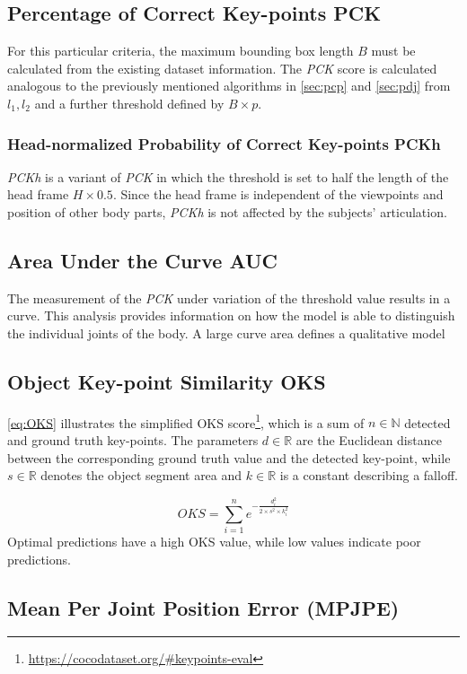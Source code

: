 \subsection{Percentage of Correct Key-points PCK}
For this particular criteria, the maximum bounding box length $B$ must be calculated from the existing dataset information. The \emph{PCK} score is calculated analogous to the previously mentioned algorithms in \autoref{sec:pcp} and \autoref{sec:pdj} from $l_{1}, l_{2}$ and a further threshold defined by $B \times p$. \cite{mpii, pck}

\subsubsection{Head-normalized Probability of Correct Key-points PCKh}
\emph{PCKh} is a variant of \emph{PCK} in which the threshold is set to half the length of the head frame $H \times 0.5$. Since the head frame is independent of the viewpoints and position of other body parts, \emph{PCKh} is not affected by the subjects' articulation. \cite{mpii}

\subsection{Area Under the Curve AUC}
The measurement of the \emph{PCK} under variation of the threshold value results in a curve. This analysis provides information on how the model is able to distinguish the individual joints of the body. A large curve area defines a qualitative model %

\subsection{Object Key-point Similarity OKS}
\autoref{eq:OKS} illustrates the simplified OKS score\footnote{\url{https://cocodataset.org/\#keypoints-eval}}, which is a sum of $ n \in \mathbb{N}$ detected and ground truth key-points. The parameters $d \in \mathbb{R}$ are the Euclidean distance between the corresponding ground truth value and the detected key-point, while $s \in \mathbb{R}$ denotes the object segment area and $k \in \mathbb{R}$ is a constant describing a falloff. 

\begin{equation}
    \label{eq:OKS}
    OKS = \sum_{i=1}^{n} e^{- \frac{d_{i}^{2}}{2 \times s^{2} \times k_{i}^{2}}}
\end{equation}
Optimal predictions have a high OKS value, while low values indicate poor predictions. 

\subsection{Mean Per Joint Position Error (MPJPE)}
\label{criteria:mpjpe}
